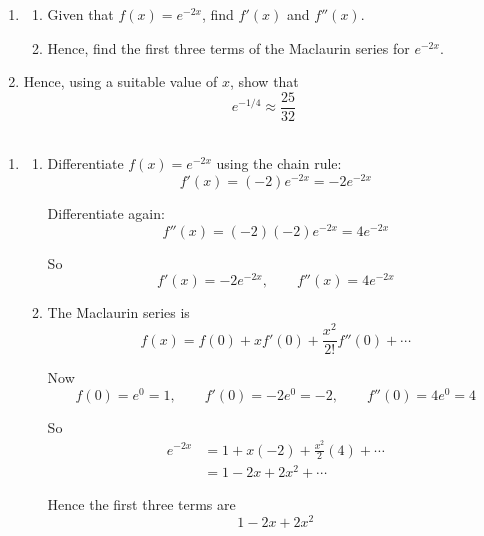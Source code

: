 \documentclass[leqno]{article}
\begin{document}
\djsFrontMatter
\begin{enumerate}[
  label=\textbf{\arabic*.},
  leftmargin=*,
  topsep=0pt,
  partopsep=0pt,
  parsep=0pt
]

\questionitem

\begin{enumerate}[label=\textbf{(\alph*)}]
  \item
  \begin{enumerate}[label=(\roman*)]
    \item Given that $f(x)=e^{-2x}$, find $f'(x)$ and $f''(x)$. 
    \item Hence, find the first three terms of the Maclaurin series for $e^{-2x}$.  \\
  \end{enumerate}
  \item Hence, using a suitable value of $x$, show that \[e^{-1/4}\approx \frac{25}{32}\]  \\
\end{enumerate}

\vspace*{10pt}

\begin{djsSolution}
\begin{enumerate}[label=\textbf{(\alph*)}]
  \item
  \begin{enumerate}[label=(\roman*)]
    \item Differentiate \(f(x)=e^{-2x}\) using the chain rule:
    \[
    f'(x)=(-2)e^{-2x}=-2e^{-2x}
    \]

    Differentiate again:
    \[
    f''(x)=(-2)(-2)e^{-2x}=4e^{-2x}
    \]

    So
    \[
    f'(x)=-2e^{-2x}, \qquad f''(x)=4e^{-2x}
    \]

    \item The Maclaurin series is
    \[
    f(x)=f(0)+xf'(0)+\frac{x^2}{2!}f''(0)+\cdots
    \]

    Now
    \[
    f(0)=e^0=1,\qquad f'(0)=-2e^0=-2,\qquad f''(0)=4e^0=4
    \]

    So
    \begin{align*}
    e^{-2x}
    &=1+x(-2)+\frac{x^2}{2}(4)+\cdots \\
    &=1-2x+2x^2+\cdots
    \end{align*}

    Hence the first three terms are
    \[
    1-2x+2x^2
    \]
  \end{enumerate}


\end{enumerate}
\end{djsSolution}
\end{enumerate}
\end{document}
